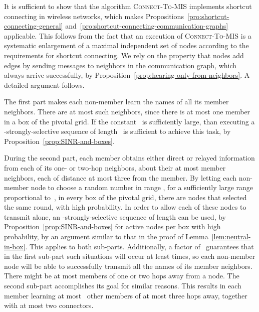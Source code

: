 \documentclass[11pt]{article}
\newcommand{\qed}{\hfill  \smallskip}
\newenvironment{proof}{\noindent{\bf Proof:}}{\qed}
\begin{document}
\begin{proof}
It is sufficient to show that the algorithm \textsc{Connect-To-MIS} implements shortcut connecting in wireless networks, which makes Propositions~\ref{pro:shortcut-connecting-general} and~\ref{pro:shortcut-connecting-communication-graphs} applicable.
This follows from the fact that an execution of \textsc{Connect-To-MIS} is a systematic enlargement of a maximal independent set of nodes according to the requirements for shortcut connecting. 
We rely on the property that nodes add edges by sending messages to neighbors  in the communication graph, which always arrive successfully, by Proposition~\ref{prop:hearing-only-from-neighbors}.
A detailed argument follows.

The first part makes each non-member learn the names of all its member neighbors.
There are at most  such neighbors, since there is at most one member in a box of the pivotal grid. 
If the constant~ is sufficiently large, than executing a -strongly-selective sequence of length~ is sufficient to achieve this task, by Proposition~\ref{prop:SINR-and-boxes}.

During the second part, each member obtains either direct or relayed information from each of its one- or two-hop neighbors, about their at most  member neighbors, each of distance at most three from the member.
By letting each non-member node to choose a random number in range ,  for a sufficiently large range proportional to~, in every box of the pivotal grid, there are  nodes that selected the same round, with high probability.
In order to allow each of these nodes to transmit alone, an -strongly-selective sequence of length  can be used, by Proposition~\ref{prop:SINR-and-boxes} for  active nodes per box with high probability, by an argument similar to that in the proof of Lemma~\ref{lem:neutral-in-box}.
This applies to both sub-parts. 
Additionally,  a factor of~ guarantees that in the first sub-part such situations will occur at least  times,  so each non-member node will be able to successfully transmit all the names of its member neighbors. 
There might be at most  members of one or two hops away from a node.
The second sub-part accomplishes its goal for similar reasons.
This results in each member learning at most~ other members of at most three hops away, together with at most two  connectors.


\end{proof}
\end{document}
